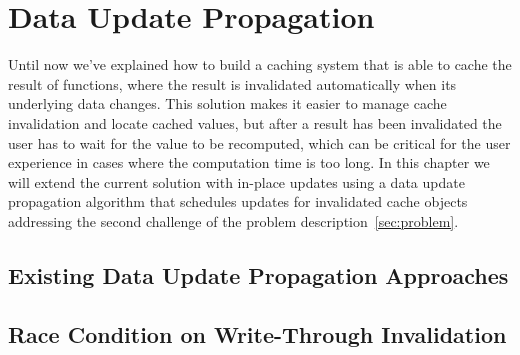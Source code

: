 \chapter{Data Update Propagation}
\label{chapter:data-update-propagation}

Until now we've explained how to build a caching system that is able to cache the result of functions, where the result is invalidated automatically when its underlying data changes. This solution makes it easier to manage cache invalidation and locate cached values, but after a result has been invalidated the user has to wait for the value to be recomputed, which can be critical for the user experience in cases where the computation time is too long.
In this chapter we will extend the current solution with in-place updates using a data update propagation algorithm that schedules updates for invalidated cache objects addressing the second challenge of the problem description~\ref{sec:problem}.



\section{Existing Data Update Propagation Approaches}
\label{sec:existing-data-update-propagation-approaches}





\section{Race Condition on Write-Through Invalidation}
\label{sec:race-condition-on-write-through-invalidation}

